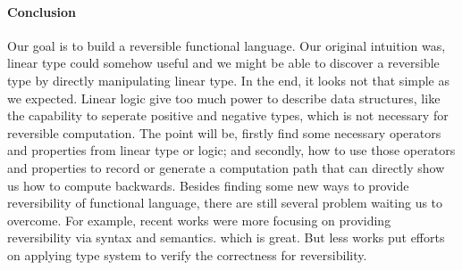 \documentclass[a4paper,twocolumn]{article}
\begin{document}

\paragraph{Conclusion}
Our goal is to build a reversible functional language. Our original intuition was, linear type could somehow useful and we might be able to discover a reversible type by directly manipulating linear type. In the end, it looks not that simple as we expected. Linear logic give too much power to describe data structures, like the capability to seperate positive and negative types, which is not necessary for reversible computation. The point will be, firstly find some necessary operators and properties from linear type or logic; and secondly, how to use those operators and properties to record or generate a computation path that can directly show us how to compute backwards. Besides finding some new ways to provide reversibility of functional language, there are still several problem waiting us to overcome. For example, recent works were more focusing on providing reversibility via syntax and semantics. which is great. But less works put efforts on applying type system to verify the correctness for reversibility.





\end{document}
